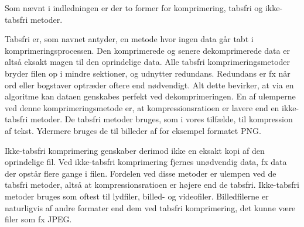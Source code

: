 Som nævnt i indledningen er der to former for komprimering, tabsfri og ikke-tabsfri metoder. 

Tabsfri er, som navnet antyder, en metode hvor ingen data går tabt i komprimeringsprocessen. Den komprimerede og senere dekomprimerede data er altså eksakt magen til den oprindelige data. Alle tabsfri komprimeringsmetoder bryder filen op i mindre sektioner, og udnytter redundans. Redundans er fx når ord eller bogstaver optræder oftere end nødvendigt. Alt dette bevirker, at via en algoritme kan dataen genskabes perfekt ved dekomprimeringen. En af ulemperne ved denne komprimeringsmetode er, at kompressionsratioen er lavere end en ikke-tabsfri metoder\cite{wisegeek}. De tabsfri metoder bruges, som i vores tilfælde, til kompression af tekst. Ydermere bruges de til billeder af for eksempel formatet PNG. 

Ikke-tabsfri komprimering genskaber derimod ikke en eksakt kopi af den oprindelige fil. Ved ikke-tabsfri komprimering fjernes unødvendig data, fx data der opstår flere gange i filen. Fordelen ved disse metoder er ulempen ved de tabsfri metoder, altså at kompressionsratioen er højere end de tabsfri. Ikke-tabsfri metoder bruges som oftest til lydfiler, billed- og videofiler\cite{maximum}. Billedfilerne er naturligvis af andre formater end dem ved tabsfri komprimering, det kunne være filer som fx JPEG.
